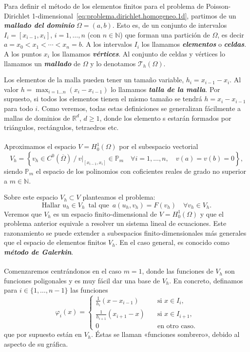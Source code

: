 \documentclass[11pt]{article}
\theoremstyle{plain}
\theoremstyle{definition}
\newcounter{stepnum}[section]
\newcommand{\step}[1][]{\bigskip\noindent\textbf{\thesection.\refstepcounter{stepnum}\thestepnum}.\enspace{#1}}
\renewcommand{\step}[1][]{\paragraph{#1}\hspace{-1.1em}}
\newcommand{\deff}[1]{\textit{\textbf{#1}}}
\newcommand{\N}{\ensuremath{\mathbb{N}}}
\newcommand{\R}{\ensuremath{\mathbb{R}}}
\renewcommand{\P}{\ensuremath{\mathbb{P}}}
\begin{document}
{Para definir el método de los elementos finitos para el problema de Poisson-Dirichlet 1-di\-men\-sio\-nal~\eqref{eq:problema.dirichlet.homogeneo.1d}, partimos de un \deff{mallado del dominio} $\Omega=(a,b)$. Esto es, de un conjunto de intervalos $I_i=[x_{i-1},x_i]$, $i=1,\dots,n$ (con $n\in\N$) que forman una partición de $\Omega$, es decir $a=x_0<x_1<\cdots<x_n=b$. 
A los intervalos $I_i$ los llamamos \deff{elementos} o \deff{celdas}. A los puntos $x_i$ los llamamos \deff{vértices}. Al conjunto de celdas y vértices lo llamamos un \deff{mallado} de $\Omega$ y lo denotamos $\mathcal{T}_h(\Omega)$. 

Los elementos de la malla pueden tener un tamaño variable, $h_i=x_{i-1}-x_i$. Al valor $h=\max_{i=1\dots n}(x_i-x_{i-1})$ lo llamamos \deff{talla de la malla}. Por supuesto, si todos los elementos tienen el mismo tamaño se tendrá $h=x_i-x_{i-1}$ para todo $i$.
Como veremos, todas estas definiciones se generalizan fácilmente a mallas de dominios de $\R^d$, $d\ge 1$, donde los elemento s estarán formados  por triángulos, rectángulos, tetraedros etc.

\step
Aproximamos el espacio $V=H_0^1(\Omega)$ por el subespacio vectorial
\[
  V_h = \left\{ v_h\in C^0(\overline\Omega) \ /\ v|_{[x_{i-1},x_i]}\in\P_m \quad \forall i=1,\dots,n, \quad v(a)=v(b)=0 \right\},
\]
siendo $\P_m$ el espacio de los polinomios con coficientes reales de grado no superior a $m\in\N$. 


Sobre este espacio $V_h\subset V$ planteamos el problema:
\begin{equation}
  \label{eq:problema.elementos-finitos.1d}
  \text{Hallar }u_h\in V_h  \enspace\text{tal que} \enspace
  a(u_h,v_h) = F(v_h) \quad \forall v_h\in V_h.
\end{equation}
Veremos que $V_h$ es un espacio finito-dimensional de $V=H_0^1(\Omega)$ y que el problema anterior equivale a resolver un sistema lineal de ecuaciones. Este razonamiento se puede extender a subespacios finito-dimensionales más generales que el espacio de elementos finitos $V_h$. En el caso general, es conocido como \deff{método de Galerkin}.

\step
Comenzaremos centrándonos en el caso  $m=1$, donde las funciones de $V_h$ son funciones poligonales y es muy fácil dar una base de $V_h$. 
En concreto, definamos para $i\in\{1,\dots,n-1\}$ las funciones
\[
  \varphi_i(x) = \left\{
    \begin{aligned}
      \frac 1{h_{i}} (x-x_{i-1}) &\quad \text{si } x\in I_{i},
      \\
      \frac 1{h_{i+1}} (x_{i+1}-x) &\quad \text{si } x\in I_{i+1},
      \\
      0 &\quad \text{en otro caso.}
    \end{aligned}
    \right.
\]
que por supuesto están en $V_h$. Éstas se llaman «funciones sombrero», debido al aspecto de su gráfica.

}
\end{document}
